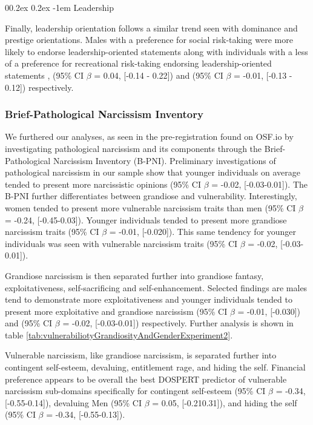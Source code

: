 \documentclass[
  donotrepeattitle,doc, 12pt, a4paper,floatsintext]{apa7}
\makeatletter
\let\oldparagraph\paragraph
\renewcommand{\paragraph}[1]{\oldparagraph{#1}\mbox{}}
\renewcommand{\paragraph}{\@startsection{paragraph}{4}{\parindent}%
  {0\baselineskip \@plus 0.2ex \@minus 0.2ex}%
  {-1em}%
  {\normalfont\normalsize\bfseries\itshape\typesectitle}}
\makeatother
\begin{document}
\hypertarget{leadership-1}{%
\paragraph{Leadership}\label{leadership-1}}

Finally, leadership orientation follows a similar trend seen with dominance and prestige orientations. Males with a preference for social risk-taking were more likely to endorse leadership-oriented statements along with individuals with a less of a preference for recreational risk-taking endorsing leadership-oriented statements , (95\% CI \(\beta\) = 0.04, {[}-0.14 - 0.22{]}) and (95\% CI \(\beta\) = -0.01, {[}-0.13 - 0.12{]}) respectively.

\hypertarget{brief-pathological-narcissism-inventory-1}{%
\subsubsection{Brief-Pathological Narcissism Inventory}\label{brief-pathological-narcissism-inventory-1}}

We furthered our analyses, as seen in the pre-registration found on OSF.io by investigating pathological narcissism and its components through the Brief-Pathological Narcissism Inventory (B-PNI). Preliminary investigations of pathological narcissism in our sample show that younger individuals on average tended to present more narcissistic opinions (95\% CI \(\beta\) = -0.02, {[}-0.03-0.01{]}). The B-PNI further differentiates between grandiose and vulnerability. Interestingly, women tended to present more vulnerable narcissism traits than men (95\% CI \(\beta\) = -0.24, {[}-0.45-0.03{]}). Younger individuals tended to present more grandiose narcissism traits (95\% CI \(\beta\) = -0.01, {[}-0.020{]}). This same tendency for younger individuals was seen with vulnerable narcissism traits (95\% CI \(\beta\) = -0.02, {[}-0.03-0.01{]}).

Grandiose narcissism is then separated further into grandiose fantasy, exploitativeness, self-sacrificing and self-enhancement. Selected findings are males tend to demonstrate more exploitativeness and younger individuals tended to present more exploitative and grandiose narcissism (95\% CI \(\beta\) = -0.01, {[}-0.030{]}) and (95\% CI \(\beta\) = -0.02, {[}-0.03-0.01{]}) respectively. Further analysis is shown in table \ref{tab:vulnerabiliotyGrandiosityAndGenderExperiment2}.

Vulnerable narcissism, like grandiose narcissism, is separated further into contingent self-esteem, devaluing, entitlement rage, and hiding the self. Financial preference appears to be overall the best DOSPERT predictor of vulnerable narcissism sub-domains specifically for contingent self-esteem (95\% CI \(\beta\) = -0.34, {[}-0.55-0.14{]}), devaluing Men (95\% CI \(\beta\) = 0.05, {[}-0.210.31{]}), and hiding the self (95\% CI \(\beta\) = -0.34, {[}-0.55-0.13{]}).
\end{document}
